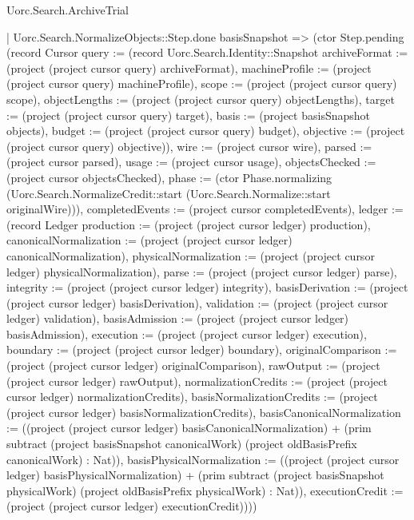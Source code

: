 \begin{lexlean}{Uorc.Search.ArchiveTrial}
\begin{semanticmodule}
{{{          | Uorc.Search.NormalizeObjects::Step.done basisSnapshot => (ctor Step.pending (record Cursor {query := (record Uorc.Search.Identity::Snapshot {archiveFormat := (project (project cursor query) archiveFormat), machineProfile := (project (project cursor query) machineProfile), scope := (project (project cursor query) scope), objectLengths := (project (project cursor query) objectLengths), target := (project (project cursor query) target), basis := (project basisSnapshot objects), budget := (project (project cursor query) budget), objective := (project (project cursor query) objective)}), wire := (project cursor wire), parsed := (project cursor parsed), usage := (project cursor usage), objectsChecked := (project cursor objectsChecked), phase := (ctor Phase.normalizing (Uorc.Search.NormalizeCredit::start (Uorc.Search.Normalize::start originalWire))), completedEvents := (project cursor completedEvents), ledger := (record Ledger {production := (project (project cursor ledger) production), canonicalNormalization := (project (project cursor ledger) canonicalNormalization), physicalNormalization := (project (project cursor ledger) physicalNormalization), parse := (project (project cursor ledger) parse), integrity := (project (project cursor ledger) integrity), basisDerivation := (project (project cursor ledger) basisDerivation), validation := (project (project cursor ledger) validation), basisAdmission := (project (project cursor ledger) basisAdmission), execution := (project (project cursor ledger) execution), boundary := (project (project cursor ledger) boundary), originalComparison := (project (project cursor ledger) originalComparison), rawOutput := (project (project cursor ledger) rawOutput), normalizationCredits := (project (project cursor ledger) normalizationCredits), basisNormalizationCredits := (project (project cursor ledger) basisNormalizationCredits), basisCanonicalNormalization := ((project (project cursor ledger) basisCanonicalNormalization) + (prim subtract (project basisSnapshot canonicalWork) (project oldBasisPrefix canonicalWork) : Nat)), basisPhysicalNormalization := ((project (project cursor ledger) basisPhysicalNormalization) + (prim subtract (project basisSnapshot physicalWork) (project oldBasisPrefix physicalWork) : Nat)), executionCredit := (project (project cursor ledger) executionCredit)})}))
}}}
\end{semanticmodule}
\end{lexlean}
